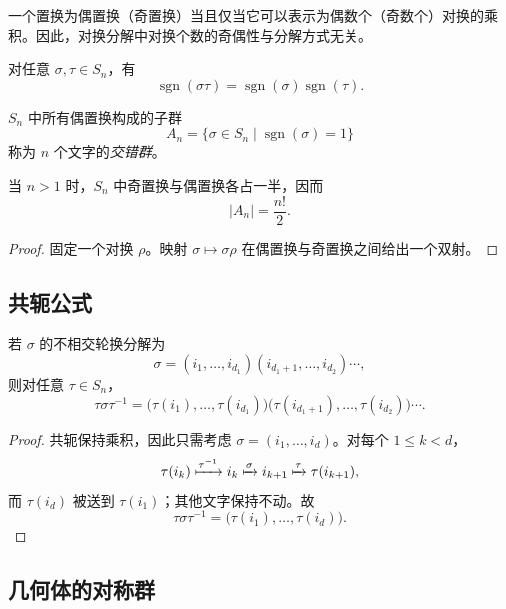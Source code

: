 \begin{corollary}
一个置换为偶置换（奇置换）当且仅当它可以表示为偶数个（奇数个）对换的乘积。因此，对换分解中对换个数的奇偶性与分解方式无关。
\end{corollary}

\begin{corollary}
对任意 $\sigma,\tau\in S_n$，有
\[
  \operatorname{sgn}(\sigma\tau)
  =\operatorname{sgn}(\sigma)\operatorname{sgn}(\tau).
\]
\end{corollary}

\begin{definition}[交错群]
$S_n$ 中所有偶置换构成的子群
\[
  A_n=\{\sigma\in S_n\mid \operatorname{sgn}(\sigma)=1\}
\]
称为 $n$ 个文字的\emph{交错群}。
\end{definition}

\begin{corollary}
当 $n>1$ 时，$S_n$ 中奇置换与偶置换各占一半，因而
\[
  |A_n|=\frac{n!}{2}.
\]
\end{corollary}

\begin{proof}
固定一个对换 $\rho$。映射 $\sigma\mapsto\sigma\rho$ 在偶置换与奇置换之间给出一个双射。
\end{proof}

\subsection{共轭公式}

\begin{proposition}[$S_n$ 中的共轭公式]
若 $\sigma$ 的不相交轮换分解为
\[
  \sigma=(i_1,\dots,i_{d_1})
  (i_{d_1+1},\dots,i_{d_2})\cdots,
\]
则对任意 $\tau\in S_n$，
\[
  \tau\sigma\tau^{-1}
  =\bigl(\tau(i_1),\dots,\tau(i_{d_1})\bigr)
   \bigl(\tau(i_{d_1+1}),\dots,\tau(i_{d_2})\bigr)\cdots.
\]
\end{proposition}

\begin{proof}
共轭保持乘积，因此只需考虑 $\sigma=(i_1,\dots,i_d)$。对每个 $1\leq k<d$，
\[
  \tau(i_k)\xmapsto{\tau^{-1}}i_k
  \xmapsto{\sigma}i_{k+1}
  \xmapsto{\tau}\tau(i_{k+1}),
\]
而 $\tau(i_d)$ 被送到 $\tau(i_1)$；其他文字保持不动。故
\[
  \tau\sigma\tau^{-1}
  =\bigl(\tau(i_1),\dots,\tau(i_d)\bigr).
\]
\end{proof}

\subsection{几何体的对称群}

